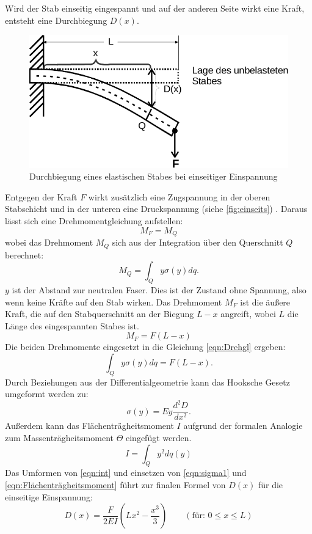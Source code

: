 Wird der Stab einseitig eingespannt und auf der anderen Seite wirkt eine Kraft, entsteht eine Durchbiegung $D(x)$.
\begin{figure}
  \centering
  \includegraphics{content/einseitig.pdf}
  \caption{Durchbiegung eines elastischen Stabes bei einseitiger Einspannung \cite[107]{V103}}
  \label{fig:einseits}
\end{figure}
Entgegen der Kraft $F$ wirkt zusätzlich eine Zugspannung in der oberen Stabschicht und in der unteren eine Druckspannung (siehe \autoref{fig:einseits}) . 
Daraus lässt sich eine Drehmomentgleichung aufstellen:
\begin{equation}
    M_F = M_Q
\label{eqn:Drehgl}
\end{equation}
wobei das Drehmoment $M_Q$ sich aus der Integration über den Querschnitt $Q$ berechnet:
\begin{equation}
    M_Q = \int_Q y \sigma(y) dq.
    \label{eqn:M_Q}
\end{equation}
$y$ ist der Abstand zur neutralen Faser. Dies ist der Zustand ohne Spannung, also wenn keine Kräfte auf den Stab wirken.
Das Drehmoment $M_F$ ist die äußere Kraft, die auf den Stabquerschnitt an der Biegung $L-x$ angreift, 
wobei $L$ die Länge des eingespannten Stabes ist.
\begin{equation}
    M_F = F(L-x)
    \label{eqn:M_F}
\end{equation}
Die beiden Drehmomente eingesetzt in die Gleichung \autoref{eqn:Drehgl} ergeben:
\begin{equation}
  \int_Q y \sigma(y) dq = F(L-x).\label{eqn:int}
\end{equation}
Durch Beziehungen aus der Differentialgeometrie kann das Hooksche Gesetz umgeformt werden zu:
\begin{equation}
   \sigma(y) = E y \frac{d^2D}{dx^2}.\label{eqn:sigma1}
\end{equation}
Außerdem kann das Flächenträgheitsmoment $I$ aufgrund der formalen Analogie zum Massenträgheitsmoment $\Theta$ eingefügt werden. \cite[109]{V103}
\begin{equation}
   I = \int_Q y^2dq(y)
   \label{eqn:Flächenträgheitsmoment}
\end{equation}
Das Umformen von \autoref{eqn:int} und einsetzen von \autoref{eqn:sigma1} und \autoref{eqn:Flächenträgheitsmoment} führt zur finalen Formel von $D(x)$ für die einseitige Einspannung:
\begin{equation}
  D(x) = \frac{F}{2 E I}(Lx^2 - \frac{x^3}{3}) \qquad (\text{für: } 0 \leq x \leq L)
  \label{eqn:Biegung}
\end{equation}

